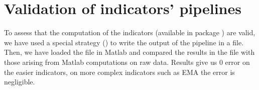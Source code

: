 \section{Validation of indicators' pipelines}\label{sec:indicatorsvalidation}

To assess that the computation of the indicators (available in package
) are valid, we have used a
special strategy () to write the output of the
pipeline in a file. Then, we have loaded the file in Matlab and compared the
results in the file with those arising from Matlab computations on raw data. Results
give us 0 error on the easier indicators, on more complex indicators such as EMA
the error is negligible.

